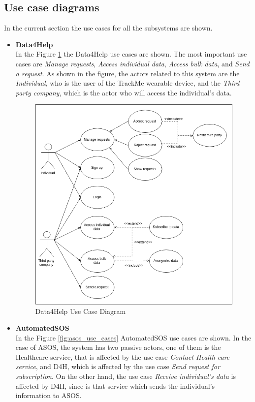 \documentclass[hidelinks, 12pt]{report}
\begin{document}
\subsection{Use case diagrams}
In the current section the use cases for all the subsystems are shown.

\begin{itemize}
\item{\textbf{Data4Help}} \\
In the Figure \ref{fig:d4h_use_cases} the Data4Help use cases are shown. The most important use cases are \textit{Manage requests}, \textit{Access individual data}, \textit{Access bulk data}, and \textit{Send a request}. As shown in the figure, the actors related to this system are the \textit{Individual}, who is the user of the TrackMe wearable device, and the \textit{Third party company}, which is the actor who will access the individual's data.

\begin{figure}[H]
\centering
	\includegraphics[scale=0.5]{Diagrams/d4h_use_cases.png}
\caption[Data4Help Use Case Diagram]{Data4Help Use Case Diagram}
\label{fig:d4h_use_cases}
\end{figure}

\item{\textbf{AutomatedSOS}}\\
In the Figure \ref{fig:asos_use_cases} AutomatedSOS use cases are shown. In the case of ASOS, the system has two passive actors, one of them is the Healthcare service, that is affected by the use case \textit{Contact Health care service}, and D4H, which is affected by the use case \textit{Send request for subscription}. On the other hand, the use case \textit{Receive individual's data} is affected by D4H, since is that service which sends the individual's information to ASOS.


\end{itemize}
\end{document}
